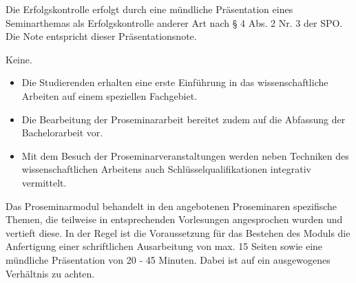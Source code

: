 \begin{course}

\setdoclanguagegerman
{}



\coursehead


\label{cour_8397.dp_997}


\begin{styleenv}
\begin{assessment}
Die Erfolgskontrolle erfolgt durch eine mündliche Präsentation eines Seminarthemas als Erfolgskontrolle anderer Art nach § 4 Abs. 2 Nr. 3 der SPO. Die Note entspricht dieser Präsentationsnote.


\end{assessment}

\begin{conditions}Keine.\end{conditions}


\end{styleenv}

\begin{learningoutcomes}
\begin{itemize}\item Die Studierenden erhalten eine erste Einführung in das wissenschaftliche Arbeiten auf einem speziellen Fachgebiet.  \item Die Bearbeitung der Proseminararbeit bereitet zudem auf die Abfassung der Bachelorarbeit vor.  \item Mit dem Besuch der Proseminarveranstaltungen werden neben Techniken des wissenschaftlichen Arbeitens auch Schlüsselqualifikationen integrativ vermittelt.  \end{itemize}
\end{learningoutcomes}

\begin{content}
Das Proseminarmodul behandelt in den angebotenen Proseminaren spezifische Themen, die teilweise in entsprechenden Vorlesungen angesprochen wurden und vertieft diese. In der Regel ist die Voraussetzung für das Bestehen des Moduls die Anfertigung einer schriftlichen Ausarbeitung von max. 15 Seiten sowie eine mündliche Präsentation von 20 - 45 Minuten. Dabei ist auf ein ausgewogenes Verhältnis zu achten.


\end{content}







\end{course}
